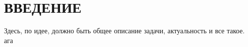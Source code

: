 \newpage
\section*{\hfil ВВЕДЕНИЕ \hfil}
	Здесь, по идее, должно быть общее описание задачи, актуальность и все такое. ага